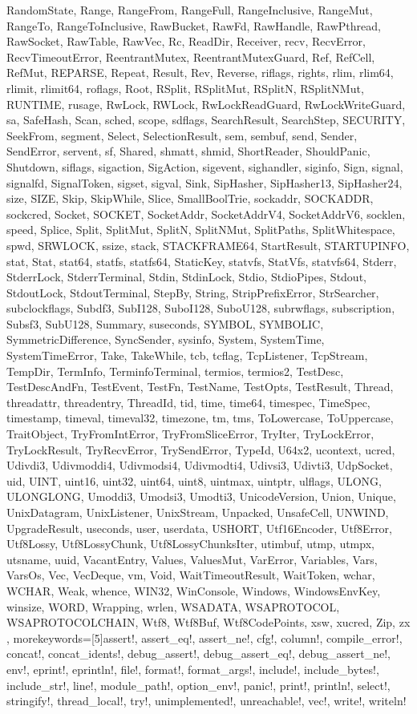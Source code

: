\documentclass[aspectratio=169]{beamer}
\begin{document}
{{RandomState, Range, RangeFrom, RangeFull, RangeInclusive, RangeMut, RangeTo,
RangeToInclusive, RawBucket, RawFd, RawHandle, RawPthread, RawSocket, RawTable,
RawVec, Rc, ReadDir, Receiver, recv, RecvError, RecvTimeoutError,
ReentrantMutex, ReentrantMutexGuard, Ref, RefCell, RefMut, REPARSE, Repeat,
Result, Rev, Reverse, riflags, rights, rlim, rlim64, rlimit, rlimit64, roflags,
Root, RSplit, RSplitMut, RSplitN, RSplitNMut, RUNTIME, rusage, RwLock, RWLock,
RwLockReadGuard, RwLockWriteGuard, sa, SafeHash, Scan, sched, scope, sdflags,
SearchResult, SearchStep, SECURITY, SeekFrom, segment, Select, SelectionResult,
sem, sembuf, send, Sender, SendError, servent, sf, Shared, shmatt, shmid,
ShortReader, ShouldPanic, Shutdown, siflags, sigaction, SigAction, sigevent,
sighandler, siginfo, Sign, signal, signalfd, SignalToken, sigset, sigval, Sink,
SipHasher, SipHasher13, SipHasher24, size, SIZE, Skip, SkipWhile, Slice,
SmallBoolTrie, sockaddr, SOCKADDR, sockcred, Socket, SOCKET, SocketAddr,
SocketAddrV4, SocketAddrV6, socklen, speed, Splice, Split, SplitMut, SplitN,
SplitNMut, SplitPaths, SplitWhitespace, spwd, SRWLOCK, ssize, stack,
STACKFRAME64, StartResult, STARTUPINFO, stat, Stat, stat64, statfs, statfs64,
StaticKey, statvfs, StatVfs, statvfs64, Stderr, StderrLock, StderrTerminal,
Stdin, StdinLock, Stdio, StdioPipes, Stdout, StdoutLock, StdoutTerminal, StepBy,
String, StripPrefixError, StrSearcher, subclockflags, Subdf3, SubI128, SuboI128,
SuboU128, subrwflags, subscription, Subsf3, SubU128, Summary, suseconds, SYMBOL,
SYMBOLIC, SymmetricDifference, SyncSender, sysinfo, System, SystemTime,
SystemTimeError, Take, TakeWhile, tcb, tcflag, TcpListener, TcpStream, TempDir,
TermInfo, TerminfoTerminal, termios, termios2, TestDesc, TestDescAndFn,
TestEvent, TestFn, TestName, TestOpts, TestResult, Thread, threadattr,
threadentry, ThreadId, tid, time, time64, timespec, TimeSpec, timestamp,
timeval, timeval32, timezone, tm, tms, ToLowercase, ToUppercase, TraitObject,
TryFromIntError, TryFromSliceError, TryIter, TryLockError, TryLockResult,
TryRecvError, TrySendError, TypeId, U64x2, ucontext, ucred, Udivdi3, Udivmoddi4,
Udivmodsi4, Udivmodti4, Udivsi3, Udivti3, UdpSocket, uid, UINT, uint16, uint32,
uint64, uint8, uintmax, uintptr, ulflags, ULONG, ULONGLONG, Umoddi3, Umodsi3,
Umodti3, UnicodeVersion, Union, Unique, UnixDatagram, UnixListener, UnixStream,
Unpacked, UnsafeCell, UNWIND, UpgradeResult, useconds, user, userdata, USHORT,
Utf16Encoder, Utf8Error, Utf8Lossy, Utf8LossyChunk, Utf8LossyChunksIter,
utimbuf, utmp, utmpx, utsname, uuid, VacantEntry, Values, ValuesMut, VarError,
Variables, Vars, VarsOs, Vec, VecDeque, vm, Void, WaitTimeoutResult, WaitToken,
wchar, WCHAR, Weak, whence, WIN32, WinConsole, Windows, WindowsEnvKey, winsize,
WORD, Wrapping, wrlen, WSADATA, WSAPROTOCOL, WSAPROTOCOLCHAIN, Wtf8, Wtf8Buf,
Wtf8CodePoints, xsw, xucred, Zip, zx}
%
, morekeywords=[5]{assert!, assert_eq!, assert_ne!, cfg!, column!,
compile_error!, concat!, concat_idents!, debug_assert!, debug_assert_eq!,
debug_assert_ne!, env!, eprint!, eprintln!, file!, format!, format_args!,
include!, include_bytes!, include_str!, line!, module_path!, option_env!,
panic!, print!, println!, select!, stringify!, thread_local!, try!,
unimplemented!, unreachable!, vec!, write!, writeln!}  %
}%
\end{document}
